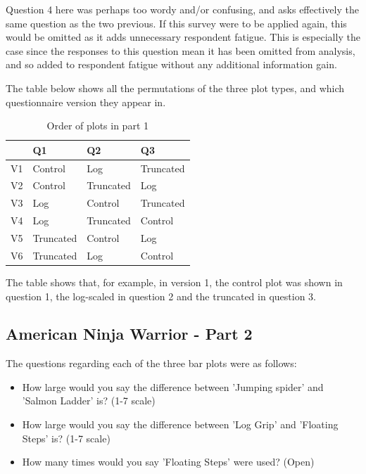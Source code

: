 \documentclass[
  11pt,
]{book}
\begin{document}
Question 4 here was perhaps too wordy and/or confusing, and asks
effectively the same question as the two previous. If this survey were
to be applied again, this would be omitted as it adds unnecessary
respondent fatigue. This is especially the case since the responses to
this question mean it has been omitted from analysis, and so added to
respondent fatigue without any additional information gain.

The table below shows all the permutations of the three plot types, and
which questionnaire version they appear in.

\begin{center}
\begin{table}

\caption{\label{tab:unnamed-chunk-5}Order of plots in part 1}
\centering
\begin{tabular}[t]{l|l|l|l}
\hline
  & Q1 & Q2 & Q3\\
\hline
V1 & Control & Log & Truncated\\
\hline
V2 & Control & Truncated & Log\\
\hline
V3 & Log & Control & Truncated\\
\hline
V4 & Log & Truncated & Control\\
\hline
V5 & Truncated & Control & Log\\
\hline
V6 & Truncated & Log & Control\\
\hline
\end{tabular}
\end{table}
\end{center}

The table shows that, for example, in version 1, the control plot was
shown in question 1, the log-scaled in question 2 and the truncated in
question 3.

\subsection{American Ninja Warrior - Part 2}

The questions regarding each of the three bar plots were as follows:

\begin{itemize}
  \item How large would you say the difference between 'Jumping spider' and 'Salmon Ladder' is? (1-7 scale)
  \item How large would you say the difference between 'Log Grip' and 'Floating Steps' is? (1-7 scale)
  \item How many times would you say 'Floating Steps' were used? (Open)
\end{itemize}
\end{document}
